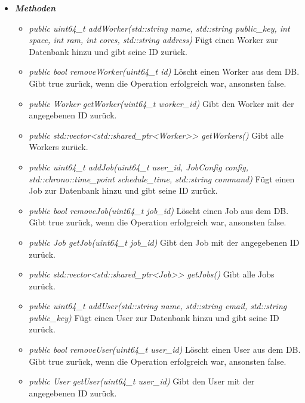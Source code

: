 \documentclass[a4paper,12pt]{article}
\begin{document}
	\begin{itemize}[label={}]
	
		\item \textit{\textbf{Methoden}}
			\begin{itemize}[label={\textbullet}]
				\item \textit{public uint64\_t addWorker(std::string name, std::string public\_key, int space, int ram, int cores, std::string address)} Fügt einen Worker zur Datenbank hinzu und gibt seine ID zurück.
				
				\item \textit{public bool removeWorker(uint64\_t id)} Löscht einen Worker aus dem DB. Gibt true zurück, wenn die Operation erfolgreich war, ansonsten false.
				
				\item \textit{public Worker getWorker(uint64\_t worker\_id)} Gibt den Worker mit der angegebenen ID zurück.
				
				\item \textit{public std::vector<std::shared\_ptr<Worker>> getWorkers()} Gibt alle Workers zurück.
				
				\item \textit{public uint64\_t addJob(uint64\_t user\_id, JobConfig config, std::chrono::time\_point schedule\_time, std::string command)} Fügt einen Job zur Datenbank hinzu und gibt seine ID zurück. 
				
				\item \textit{public bool removeJob(uint64\_t job\_id)} Löscht einen Job aus dem DB. Gibt true zurück, wenn die Operation erfolgreich war, ansonsten false.
				
				\item \textit{public Job getJob(uint64\_t job\_id)} Gibt den Job mit der angegebenen ID zurück.
				
				\item \textit{public std::vector<std::shared\_ptr<Job>> getJobs()} Gibt alle Jobs zurück.
				
				\item \textit{public uint64\_t addUser(std::string name, std::string email, std::string public\_key)} Fügt einen User zur Datenbank hinzu und gibt seine ID zurück. 
				
				\item \textit{public bool removeUser(uint64\_t user\_id)} Löscht einen User aus dem DB. Gibt true zurück, wenn die Operation erfolgreich war, ansonsten false.
				
				\item \textit{public User getUser(uint64\_t user\_id)} Gibt den User mit der angegebenen ID zurück.
				

\end{itemize}
\end{itemize}
\end{document}

